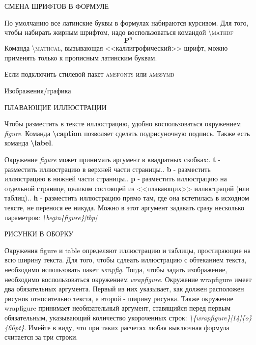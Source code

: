 \documentclass[a4paper,14pt]{extarticle}
\theoremstyle{plain} %
\theoremstyle{definition} %
\theoremstyle{remark} %
\begin{document}
СМЕНА ШРИФТОВ В ФОРМУЛЕ

По умолчанию все латинские буквы в формулах набираются курсивом.\newline
Для того, чтобы набирать жирным шрифтом, надо воспользоваться командой \textsc{\textbackslash mathbf}
\begin{equation*}
	\mathbf P^n
\end{equation*}
Команда \textsc{\textbackslash mathcal}, вызывающая <<каллигрофический>> шрифт, можно применять только к прописным латинским буквам.

Если подключить стилевой пакет \textsc{amsfonts} или \textsc{amssymb}

\begin{center}
	Изображения/графика
\end{center}

ПЛАВАЮЩИЕ ИЛЛЮСТРАЦИИ

Чтобы разместить в тексте иллюстрацию, удобно воспользоваться окружением \textit{figure}. Команда \textbf{\textbackslash caption} позволяет сделать подрисуночную подпись. Также есть команда \textbf{\textbackslash label}.

Окружение \textit{figure} может принимать аргумент в квадратных скобках:. \textbf{t} - разместить иллюстрацию в верхней части страницы.. \textbf{b} - разместить иллюстрацию в нижней части страницы.. \textbf{p} - разместить иллюстрацию на отдельной странице, целиком состоящей из <<плавающих>> иллюстраций (или таблиц).. \textbf{h} - разместить иллюстрацию прямо там, где она встетилась в исходном тексте, не перенося ее никуда.\newline
Можно в этот аргумент задавать сразу несколько параметров: \textit{\textbackslash begin\{figure\}[tbp]}

РИСУНКИ В ОБОРКУ

Окружения figure и table определяют иллюстрацию и таблицы, простирающие на всю ширину текста. Для того, чтобы сдлеать иллюстрацию с обтеканием текста, необходимо использовать пакет \textit{wrapfig}. Тогда, чтобы задать изображение, необходимо воспользоваться окружением \textit{wrapfigure}.\newline
Окружение wrapfigure имеет два обязательных аргумента. Первый из них указывает, как должен расположен рисунок относительно текста, а второй - ширину рисунка.\newline
Также окружение wrapfigure принимает необязательный аргумент, ставящийся перед первым обязательным, указывающий количество укороченных строк: \textit{\textbackslash \{wrapfigure\}[14]\{o\}\{60pt\}}. Имейте в виду, что при таких расчетах любая выключная формула считается за три строки.
\end{document}
